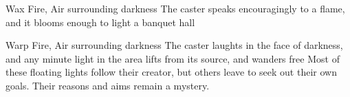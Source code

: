   {}%
  {Wax}%
  {Fire, Air}%
  {surrounding darkness}%
  {The caster speaks encouragingly to a flame, and it blooms enough to light a banquet hall}%
  {}

  {}%
  {Warp}%
  {Fire, Air}%
  {surrounding darkness}%
  {The caster laughts in the face of darkness, and any minute light in the area lifts from its source, and wanders free}%
  {Most of these floating lights follow their creator, but others leave to seek out their own goals.
  Their reasons and aims remain a mystery.}

